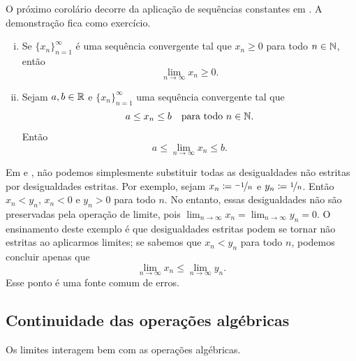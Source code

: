 O próximo corolário decorre da aplicação de sequências constantes em
. A demonstração fica como exercício.

\begin{samepage}
\begin{cor} \label{limandineq:cor}
\leavevmode
\begin{enumerate}[(i)]
\item Se $\{ x_n \}_{n=1}^\infty$ é uma sequência convergente tal que $x_n \geq 0$ para todo
$n \in {\mathbb{N}}$,
então
\begin{equation*}
\lim_{n\to\infty} x_n \geq 0.
\end{equation*}
\item
Sejam $a,b \in {\mathbb{R}}$ e
$\{ x_n \}_{n=1}^\infty$ uma sequência convergente tal que
\begin{equation*}
a \leq x_n \leq b \quad \text{para todo } n \in {\mathbb{N}} .
\end{equation*}
Então
\begin{equation*}
a \leq \lim_{n\to\infty} x_n \leq b.
\end{equation*}
\end{enumerate}
\end{cor}
\end{samepage}

Em  e , não podemos simplesmente substituir
todas as desigualdades não estritas por desigualdades estritas. Por exemplo,
sejam $x_n \coloneqq \nicefrac{-1}{n}$ e $y_n \coloneqq \nicefrac{1}{n}$.
Então $x_n < y_n$, $x_n < 0$ e $y_n > 0$ para todo $n$. No entanto, essas desigualdades
não são preservadas pela operação de limite, pois
$\lim_{n\to\infty} x_n = \lim_{n\to\infty} y_n = 0$.
O ensinamento deste exemplo é que desigualdades estritas podem se tornar não estritas
ao aplicarmos limites; se sabemos que $x_n < y_n$ para todo $n$,
podemos concluir apenas que
\begin{equation*}
\lim_{n \to \infty} x_n \leq
\lim_{n \to \infty} y_n .
\end{equation*}
Esse ponto é uma fonte comum de erros.

\subsection{Continuidade das operações algébricas}

Os limites interagem bem com as operações algébricas.

